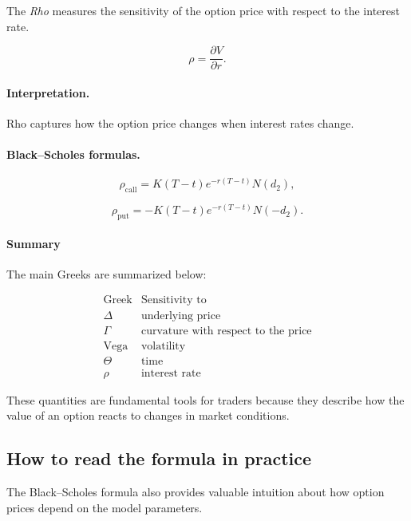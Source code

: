 \documentclass[11pt]{article}
\newcommand{\1}{\mathbf{1}}
\theoremstyle{plain}
\theoremstyle{definition}
\theoremstyle{remark}
\begin{document}
The \emph{Rho} measures the sensitivity of the option price with respect
to the interest rate.

\[
\rho = \frac{\partial V}{\partial r}.
\]

\paragraph{Interpretation.}

Rho captures how the option price changes when interest rates change.

\paragraph{Black--Scholes formulas.}

\[
\rho_{\text{call}}
=
K(T-t)e^{-r(T-t)} N(d_2),
\]

\[
\rho_{\text{put}}
=
- K(T-t)e^{-r(T-t)} N(-d_2).
\]

\paragraph{Summary}

The main Greeks are summarized below:

\[
\begin{array}{c|c}
\text{Greek} & \text{Sensitivity to} \\ \hline
\Delta & \text{underlying price} \\
\Gamma & \text{curvature with respect to the price} \\
\text{Vega} & \text{volatility} \\
\Theta & \text{time} \\
\rho & \text{interest rate}
\end{array}
\]

These quantities are fundamental tools for traders because they describe
how the value of an option reacts to changes in market conditions.



\subsection{How to read the formula in practice}

The Black--Scholes formula also provides valuable intuition about how
option prices depend on the model parameters.
\end{document}
